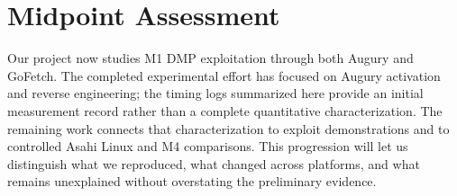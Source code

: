 \section{Midpoint Assessment}
Our project now studies M1 DMP exploitation through both Augury and GoFetch. The completed experimental effort has focused on Augury activation and reverse engineering; the timing logs summarized here provide an initial measurement record rather than a complete quantitative characterization. The remaining work connects that characterization to exploit demonstrations and to controlled Asahi Linux and M4 comparisons. This progression will let us distinguish what we reproduced, what changed across platforms, and what remains unexplained without overstating the preliminary evidence.

